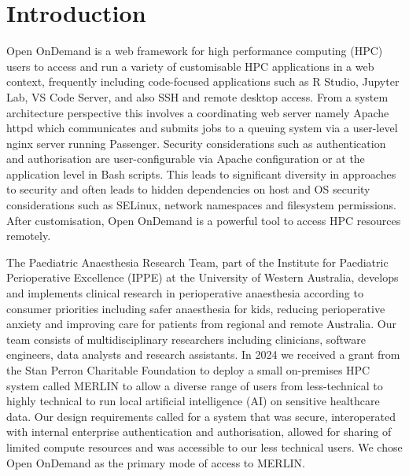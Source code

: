 \documentclass[sigconf,authordraft]{acmart}
\begin{document}

\maketitle

\section{Introduction}
Open OnDemand \cite{Hudak2018} is a web framework for high performance computing (HPC) users to access and run a variety of customisable HPC applications in a web context, frequently including code-focused applications such as R Studio, Jupyter Lab, VS Code Server, and also SSH and remote desktop access. From a system architecture perspective \cite{OODArch} this involves a coordinating web server namely Apache httpd which communicates and submits jobs to a queuing system via a user-level nginx server running Passenger. Security considerations such as authentication and authorisation are user-configurable via Apache configuration or at the application level in Bash scripts. This leads to significant diversity in approaches to security and often leads to hidden dependencies on host and OS security considerations such as SELinux, network namespaces and filesystem permissions. After customisation, Open OnDemand is a powerful tool to access HPC resources remotely. 


The Paediatric Anaesthesia Research Team, part of the Institute for Paediatric Perioperative Excellence (IPPE) at the University of Western Australia, develops and implements clinical research in perioperative anaesthesia according to consumer priorities \cite{blind_sommerfield_consumer_2023} including safer anaesthesia for kids, reducing perioperative anxiety and improving care for patients from regional and remote Australia. Our team consists of multidisciplinary researchers including clinicians, software engineers, data analysts and research assistants. In 2024 we received a grant from the Stan Perron Charitable Foundation to deploy a small on-premises HPC system called MERLIN to allow a diverse range of users from less-technical to highly technical to run local artificial intelligence (AI) on sensitive healthcare data. Our design requirements called for a system that was secure, interoperated with internal enterprise authentication and authorisation, allowed for sharing of limited compute resources and was accessible to our less technical users. We chose Open OnDemand as the primary mode of access to MERLIN. 
\end{document}
